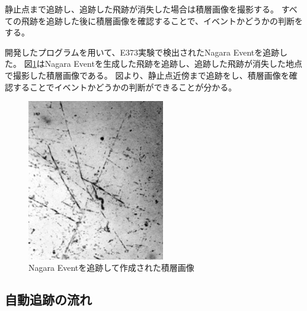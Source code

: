 \documentclass[12pt,a4paper]{jarticle}
\begin{document}
静止点まで追跡し、追跡した飛跡が消失した場合は積層画像を撮影する。
すべての飛跡を追跡した後に積層画像を確認することで、イベントかどうかの判断をする。
\par
開発したプログラムを用いて、E373実験で検出されたNagara Eventを追跡した。
図\ref{fig:nagara_sekisou}はNagara Eventを生成した飛跡を追跡し、追跡した飛跡が消失した地点で撮影した積層画像である。
図より、静止点近傍まで追跡をし、積層画像を確認することでイベントかどうかの判断ができることが分かる。
\begin{figure}[htbp]
  \centering
     \includegraphics[width=60mm]{superimpsed_org4.png}
  \caption{Nagara Eventを追跡して作成された積層画像\label{fig:nagara_sekisou}}
\end{figure}
\newpage
\subsection{自動追跡の流れ}
\end{document}
